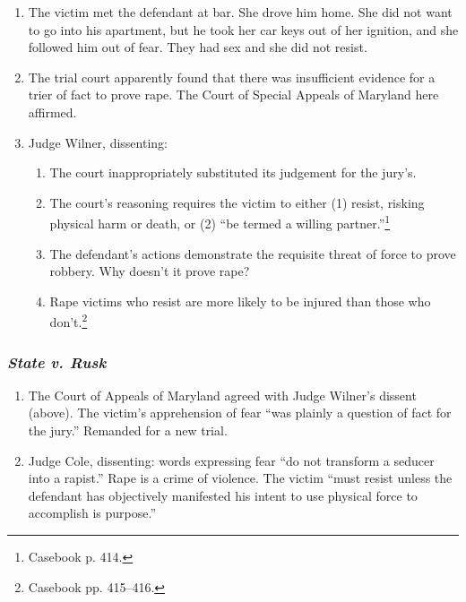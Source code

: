 \begin{enumerate}
    \item The victim met the defendant at bar. She drove him home. She did not want to go into his apartment, but he took her car keys out of her ignition, and she followed him out of fear. They had sex and she did not resist.
    \item The trial court apparently found that there was insufficient evidence for a trier of fact to prove rape. The Court of Special Appeals of Maryland here affirmed.
    \item Judge Wilner, dissenting:
    \begin{enumerate}
        \item The court inappropriately substituted its judgement for the jury's.
        \item The court's reasoning requires the victim to either (1) resist, risking physical harm or death, or (2) ``be termed a willing partner.''\footnote{Casebook p. 414.}
        \item The defendant's actions demonstrate the requisite threat of force to prove robbery. Why doesn't it prove rape?
        \item Rape victims who resist are more likely to be injured than those who don't.\footnote{Casebook pp. 415--416.}
    \end{enumerate}
\end{enumerate}

\subsubsection{\emph{State v. Rusk}}

\begin{enumerate}
    \item The Court of Appeals of Maryland agreed with Judge Wilner's dissent (above). The victim's apprehension of fear ``was plainly a question of fact for the jury.'' Remanded for a new trial.
    \item Judge Cole, dissenting: words expressing fear ``do not transform a seducer into a rapist.'' Rape is a crime of violence. The victim ``must resist unless the defendant has objectively manifested his intent to use physical force to accomplish is purpose.''
\end{enumerate}

